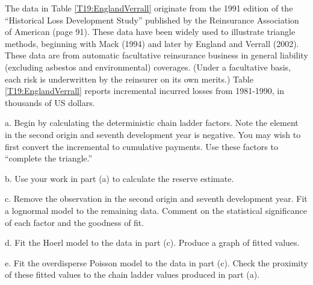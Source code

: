 \begin{exercises}



\item \label{Ex19:Ex1} The data in Table \ref{T19:EnglandVerrall} originate from
the 1991 edition of the ``Historical Loss Development Study''
published by the Reinsurance Association of American (page 91).
These data have been widely used to illustrate triangle methods,
beginning with Mack (1994) and later by England and Verrall (2002).
These data are from automatic facultative reinsurance business in
general liability (excluding asbestos and environmental) coverages.
(Under a facultative basis, each risk is underwritten by the
reinsurer on its own merits.) Table \ref{T19:EnglandVerrall} reports
incremental incurred losses from 1981-1990, in thousands of US
dollars.



a. Begin by calculating the deterministic chain ladder factors. Note
the element in the second origin and seventh development year is
negative. You may wish to first convert the incremental to
cumulative payments. Use these factors to ``complete the triangle.''

b. Use your work in part (a) to calculate the reserve estimate.

c. Remove the observation in the second origin and seventh
development year. Fit a lognormal model to the remaining data.
Comment on the statistical significance of each factor and the
goodness of fit.

d. Fit the Hoerl model to the data in part (c). Produce a graph of
fitted values.

e. Fit the overdisperse Poisson model to the data in part (c). Check
the proximity of these fitted values to the chain ladder values
produced in part (a).



\end{exercises}
